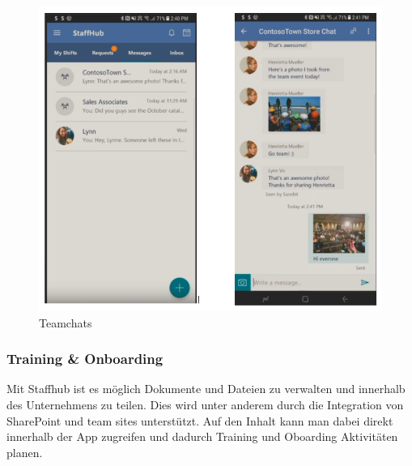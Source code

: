 \begin{figure}[H] 
\centering 
\includegraphics[scale=0.78]{images/groupchat} 
\caption[Teamchats]{Teamchats\protect} 
\label{ws} 
\end{figure}

\subsubsection{Training \& Onboarding}

Mit Staffhub ist es möglich Dokumente und Dateien zu verwalten und innerhalb des Unternehmens zu teilen. Dies wird unter anderem durch die Integration von SharePoint und team sites unterstützt. Auf den Inhalt kann man dabei direkt innerhalb der App zugreifen und dadurch Training und Oboarding Aktivitäten planen.

